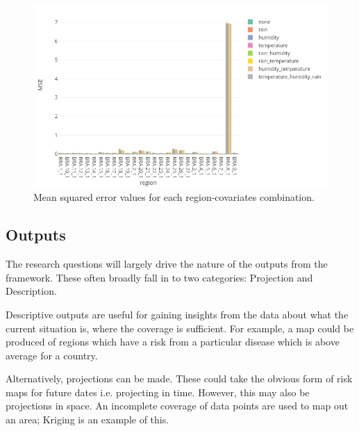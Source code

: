 \documentclass{article}
\begin{document}
\begin{figure}[h]
    \centering
    \includegraphics[scale=0.4]{images/bestcovs.png}
    \caption{Mean squared error values for each region-covariates combination.}
    \label{fig:bestcovs}
\end{figure}







\subsection{Outputs}

The research questions will largely drive the nature of the outputs from the framework. These often broadly fall in to two categories: Projection and Description.



Descriptive outputs are useful for gaining insights from the data about what the current situation is, where the coverage is sufficient. For example, a map could be produced of regions which have a risk from a particular disease which is above average for a country.

Alternatively, projections can be made. These could take the obvious form of risk maps for future dates i.e. projecting in time. However, this may also be projections in space. An incomplete coverage of data points are used to map out an area; Kriging is an example of this.






\end{document}
